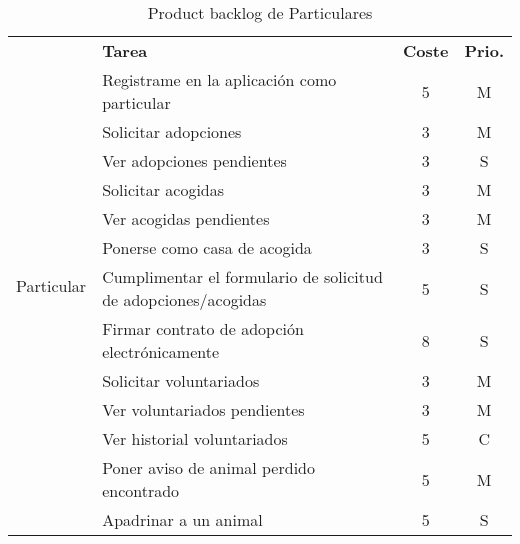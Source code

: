 \begin{table}[H]
    \centering
    \begin{tabular}{|c |p{8cm}|c |c|} \hline 
         \multirow[c]{15}{*}{Particular}&  \textbf{Tarea}&  \textbf{Coste}& \textbf{Prio.}\\  \cline{2-4}
         &  Registrame en la aplicación como particular&  5& M\\ \cline{2-4} 
         

         &  Solicitar adopciones&  3& M\\ \cline{2-4}
         &  Ver adopciones pendientes&  3& S\\ \cline{2-4}
         
         &  Solicitar acogidas&  3& M\\ \cline{2-4} 
         &  Ver acogidas pendientes&  3& M\\ \cline{2-4}
       
         &  Ponerse como casa de acogida&  3& S\\ \cline{2-4}
         
         &  Cumplimentar el formulario de solicitud de adopciones/acogidas &  5& S\\ \cline{2-4}
		 &  Firmar contrato de adopción electrónicamente&  8& S\\ \cline{2-4}
		 
		 
         &  Solicitar voluntariados&  3& M\\ \cline{2-4} 
         &  Ver voluntariados pendientes&  3& M\\ \cline{2-4}
         &  Ver historial voluntariados&  5& C\\ \cline{2-4}
         
         & Poner aviso de animal perdido encontrado & 5 & M \\ \cline{2-4}
         
         & Apadrinar a un animal&  5& S\\ \hline
         
         
         
    \end{tabular}
    \caption{Product backlog de Particulares}
    \label{tab:pb_particulares}
\end{table}

